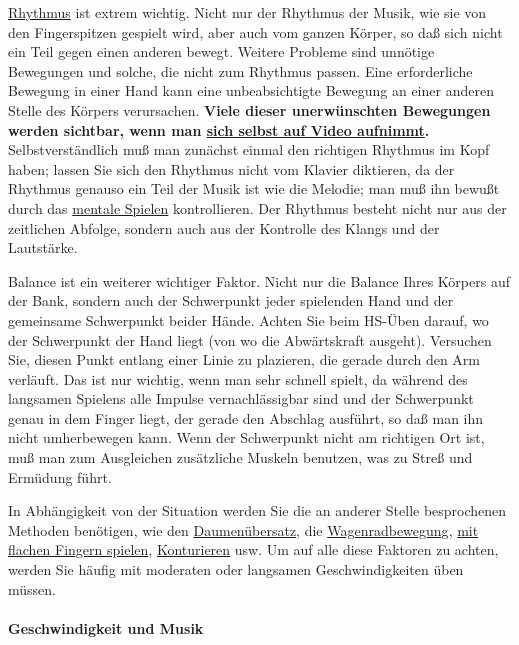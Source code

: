 \hyperref[c1iii1b]{Rhythmus} ist extrem wichtig.
Nicht nur der Rhythmus der Musik, wie sie von den Fingerspitzen gespielt wird, aber auch vom ganzen Körper, so daß sich nicht ein Teil gegen einen anderen bewegt.
Weitere Probleme sind unnötige Bewegungen und solche, die nicht zum Rhythmus passen.
Eine erforderliche Bewegung in einer Hand kann eine unbeabsichtigte Bewegung an einer anderen Stelle des Körpers verursachen.
\textbf{Viele dieser unerwünschten Bewegungen werden sichtbar, wenn man \hyperref[c1iii13]{sich selbst auf Video aufnimmt}.}
Selbstverständlich muß man zunächst einmal den richtigen Rhythmus im Kopf haben; lassen Sie sich den Rhythmus nicht vom Klavier diktieren, da der Rhythmus genauso ein Teil der Musik ist wie die Melodie; man muß ihn bewußt durch das \hyperref[c1ii12]{mentale Spielen} kontrollieren.
Der Rhythmus besteht nicht nur aus der zeitlichen Abfolge, sondern auch aus der Kontrolle des Klangs und der Lautstärke.

Balance ist ein weiterer wichtiger Faktor.
Nicht nur die Balance Ihres Körpers auf der Bank, sondern auch der Schwerpunkt jeder spielenden Hand und der gemeinsame Schwerpunkt beider Hände.
Achten Sie beim HS-Üben darauf, wo der Schwerpunkt der Hand liegt (von wo die Abwärtskraft ausgeht).
Versuchen Sie, diesen Punkt entlang einer Linie zu plazieren, die gerade durch den Arm verläuft.
Das ist nur wichtig, wenn man sehr schnell spielt, da während des langsamen Spielens alle Impulse vernachlässigbar sind und der Schwerpunkt genau in dem Finger liegt, der gerade den Abschlag ausführt, so daß man ihn nicht umherbewegen kann.
Wenn der Schwerpunkt nicht am richtigen Ort ist, muß man zum Ausgleichen zusätzliche Muskeln benutzen, was zu Streß und Ermüdung führt.

In Abhängigkeit von der Situation werden Sie die an anderer Stelle besprochenen Methoden benötigen, wie den \hyperref[c1iii5b]{Daumenübersatz}, die \hyperref[c1iii5wagen]{Wagenradbewegung}, \hyperref[c1iii4b]{mit flachen Fingern spielen}, \hyperref[c1iii8]{Konturieren} usw.
Um auf alle diese Faktoren zu achten, werden Sie häufig mit moderaten oder langsamen Geschwindigkeiten üben müssen.


\paragraph{Geschwindigkeit und Musik}
\label{c1iii7iMusik}

